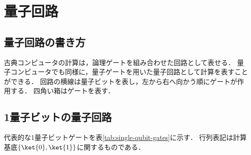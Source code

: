 \section{量子回路}
\label{sec:quantum-circuits}


\subsection{量子回路の書き方}

古典コンピュータの計算は，論理ゲートを組み合わせた回路として表せる．
量子コンピュータでも同様に，量子ゲートを用いた量子回路として計算を表すことができる．
回路の横線は量子ビットを表し，左から右へ向かう順にゲートが作用する．
四角い箱はゲートを表す．

\subsection{1量子ビットの量子回路}

代表的な1量子ビットゲートを表\ref{tab:single-qubit-gates}に示す．
行列表記は計算基底$\{\ket{0},\ket{1}\}$に関するものである．

